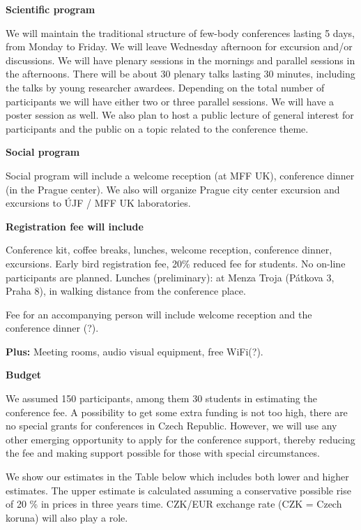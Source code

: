 \documentclass{article}[14pt]
\begin{document}
\begin{center}
{\bf \large Scientific program}
\end{center}

We will maintain the traditional structure of few-body conferences lasting 5 days, from Monday
to Friday. We will leave Wednesday afternoon for excursion and/or discussions. We will have plenary sessions
in the mornings and parallel sessions in the afternoons. There will be about 30 plenary talks lasting
30 minutes, including the talks by young researcher awardees. Depending on the total number of
participants we will have either two or three parallel sessions. We will have a poster session as well.
We also plan to host a public lecture of general interest for participants and the public on a topic related
to the conference theme. 

\begin{center}
{\bf \large Social program}
\end{center}
Social program will include a welcome reception (at MFF UK), conference dinner (in the Prague center). 
We also will organize Prague city center excursion and excursions to ÚJF / MFF UK laboratories.

\begin{center}
{\bf \large Registration fee will include}
\end{center}
Conference kit, coffee breaks, lunches, welcome reception, conference dinner, excursions. Early bird registration fee, 20\%
reduced fee for students. No on-line participants are planned.
Lunches (preliminary): at Menza Troja (Pátkova 3, Praha 8), in walking distance from the conference place.

Fee for an accompanying person will include welcome reception and the conference dinner (?).

{\bf Plus:} Meeting rooms,  audio visual equipment,  free WiFi(?).


\begin{center}
{\bf \large Budget}
\end{center}

We assumed 150 participants, among them 30 students in estimating the conference fee.
A possibility to  get some extra funding is not too high, there are no special grants for conferences
in Czech Republic. However, we will use any other emerging opportunity to apply for the conference
support, thereby reducing the fee and making support possible for those with special circumstances.

We show our estimates in the Table below which includes both lower and higher estimates. The upper
estimate is calculated assuming a conservative possible rise of 20 \% in prices in three years time.  
CZK/EUR exchange rate (CZK = Czech koruna) will also play a role.
\end{document}

